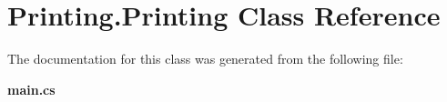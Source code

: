 \section{Printing.\-Printing Class Reference}
\label{class_printing_1_1_printing}


The documentation for this class was generated from the following file\-:\begin{DoxyCompactItemize}
\item 
{\bf main.\-cs}\end{DoxyCompactItemize}
